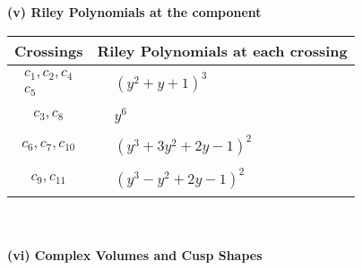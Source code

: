 \documentclass[1p]{elsarticle_modified}
\theoremstyle{definition}
\begin{document}
\newpage\renewcommand{\arraystretch}{1}
\flushleft \textbf{(v) Riley Polynomials at the component}\newline \\
\begin{tabular}{m{50pt}|m{274pt}}
Crossings & \hspace{64pt}Riley Polynomials at each crossing \\
\hline $$\begin{aligned}c_{1},c_{2},c_{4}\\c_{5}\end{aligned}$$&$\begin{aligned}
&(y^2+y+1)^3
\end{aligned}$\\
\hline $$\begin{aligned}c_{3},c_{8}\end{aligned}$$&$\begin{aligned}
&y^6
\end{aligned}$\\
\hline $$\begin{aligned}c_{6},c_{7},c_{10}\end{aligned}$$&$\begin{aligned}
&(y^3+3 y^2+2 y-1)^2
\end{aligned}$\\
\hline $$\begin{aligned}c_{9},c_{11}\end{aligned}$$&$\begin{aligned}
&(y^3- y^2+2 y-1)^2
\end{aligned}$\\
\hline
\end{tabular}\\~\\
\newpage\flushleft \textbf{(vi) Complex Volumes and Cusp Shapes}
\end{document}
